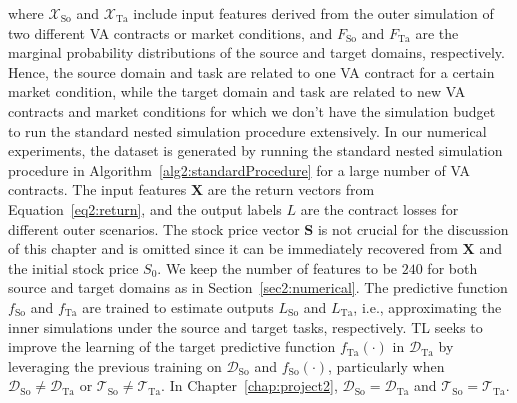 where $\mathcal{X}_{\text{So}}$ and $\mathcal{X}_{\text{Ta}}$ include input features derived from the outer simulation of two different VA contracts or market conditions, and $F_{\text{So}}$ and $F_{\text{Ta}}$ are the marginal probability distributions of the source and target domains, respectively.
Hence, the source domain and task are related to one VA contract for a certain market condition, while the target domain and task are related to new VA contracts and market conditions for which we don't have the simulation budget to run the standard nested simulation procedure extensively.
In our numerical experiments, the dataset is generated by running the standard nested simulation procedure in Algorithm~\ref{alg2:standardProcedure} for a large number of VA contracts.
The input features $\mathbf{X}$ are the return vectors from Equation~\ref{eq2:return}, and the output labels $L$ are the contract losses for different outer scenarios.
The stock price vector $\mathbf{S}$ is not crucial for the discussion of this chapter and is omitted since it can be immediately recovered from $\mathbf{X}$ and the initial stock price $S_0$.
We keep the number of features to be $\num{240}$ for both source and target domains as in Section~\ref{sec2:numerical}.
The predictive function $f_{\text{So}}$ and $f_{\text{Ta}}$ are trained to estimate outputs $L_{\text{So}}$ and $L_{\text{Ta}}$, i.e., approximating the inner simulations under the source and target tasks, respectively.
TL seeks to improve the learning of the target predictive function $f_{\text{Ta}}(\cdot)$ in $\mathcal{D}_{\text{Ta}}$ by leveraging the previous training on $\mathcal{D}_{\text{So}}$ and $f_{\text{So}}(\cdot)$, particularly when $\mathcal{D}_{\text{So}} \neq \mathcal{D}_{\text{Ta}}$ or $\mathcal{T}_{\text{So}} \neq \mathcal{T}_{\text{Ta}}$.
In Chapter~\ref{chap:project2}, $\mathcal{D}_{\text{So}} = \mathcal{D}_{\text{Ta}}$ and $\mathcal{T}_{\text{So}} = \mathcal{T}_{\text{Ta}}$.

